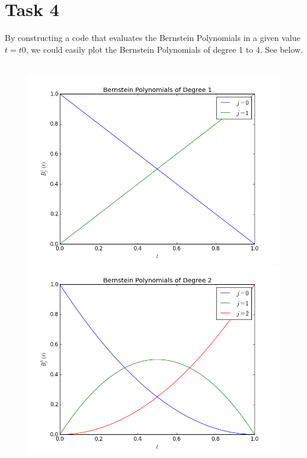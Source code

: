 \documentclass[]{article}
\begin{document}
\section*{Task 4}
By constructing a code that evaluates the Bernstein Polynomials in a given value $t=t0$, we could easily plot the Bernstein Polynomials of degree 1 to 4. See below. \\
\\
\begin{figure}[h!]
\hspace*{-2cm} 
\includegraphics[scale=0.4]{Bernstein_deg1}
\includegraphics[scale=0.4]{Bernstein_deg2}
\hspace*{-2cm}

\end{figure}
\end{document}
